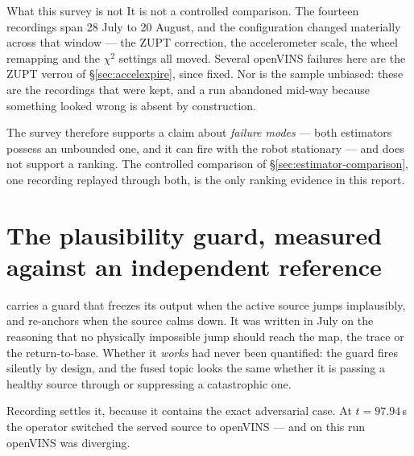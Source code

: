 \begin{trapbox}{What this survey is not}
It is not a controlled comparison. The fourteen recordings span 28 July to
20 August, and the configuration changed materially across that window ---
the ZUPT correction, the accelerometer scale, the wheel remapping and the
$\chi^2$ settings all moved. Several openVINS failures here are the ZUPT
verrou of \S\ref{sec:accelexpire}, since fixed. Nor is the sample
unbiased: these are the recordings that were kept, and a run abandoned
mid-way because something looked wrong is absent by construction.

The survey therefore supports a claim about \emph{failure modes} --- both
estimators possess an unbounded one, and it can fire with the robot
stationary --- and does not support a ranking. The controlled comparison of
\S\ref{sec:estimator-comparison}, one recording replayed through both, is
the only ranking evidence in this report.
\end{trapbox}

\section{The plausibility guard, measured against an independent reference}
\label{sec:gardemesuree}

 carries a guard that freezes its output when the active
source jumps implausibly, and re-anchors when the source calms down. It was
written in July on the reasoning that no physically impossible jump should
reach the map, the trace or the return-to-base. Whether it \emph{works} had
never been quantified: the guard fires silently by design, and the fused
topic looks the same whether it is passing a healthy source through or
suppressing a catastrophic one.

Recording  settles it, because it contains
the exact adversarial case. At $t = 97.94$\,s the operator switched the
served source to openVINS --- and on this run openVINS was diverging.

